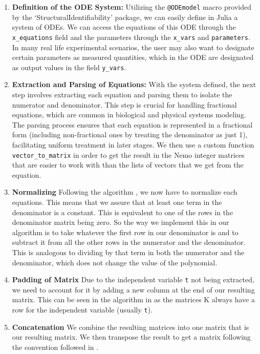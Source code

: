 \documentclass[oneside, a4paper, onecolumn, 11pt]{article}
\begin{document}
\begin{enumerate}
    \item \textbf{Definition of the ODE System:} Utilizing the \texttt{@ODEmodel} macro provided by the `StructuralIdentifiability' package, we can easily define in Julia a system of ODEs. We can access the equations of this ODE through the \texttt{x\_equations} field and the parameters through the \texttt{x\_vars} and \texttt{parameters}. In many real life experimental scenarios, the user may also want to designate certain parameters as measured quantities, which in the ODE are designated as output values in the field \texttt{y\_vars}.

    \item \textbf{Extraction and Parsing of Equations:} With the system defined, the next step involves extracting each equation and parsing them to isolate the numerator and denominator. This step is crucial for handling fractional equations, which are common in biological and physical systems modeling. The parsing process ensures that each equation is represented in a fractional form (including non-fractional ones by treating the denominator as just 1), facilitating uniform treatment in later stages. We then use a custom function \texttt{vector\_to\_matrix} in order to get the result in the Nemo integer matrices that are easier to work with than the lists of vectors that we get from the equation.

    \item \textbf{Normalizing} Following the algorithm \cite{Hubert2013}, we now have to normalize each equations. This means that we assure that at least one term in the denominator is a constant. This is equivalent to one of the rows in the denominator matrix being zero. So the way we implement this in our algorithm is to take whatever the first row in our denominator is and to subtract it from all the other rows in the numerator and the denominator. This is analogous to dividing by that term in both the numerator and the denominator, which does not change the value of the polynomial.

    \item \textbf{Padding of Matrix} Due to the independent variable \texttt{t} not being extracted, we need to account for it by adding a new column at the end of our resulting matrix. This can be seen in the algorithm in \cite{Hubert2013} as the matrices K always have a row for the independent variable (usually \texttt{t}).

    \item \textbf{Concatenation} We combine the resulting matrices into one matrix that is our resulting matrix. We then transpose the result to get a matrix following the convention followed in \cite{Hubert2013}.
\end{enumerate}
\end{document}
